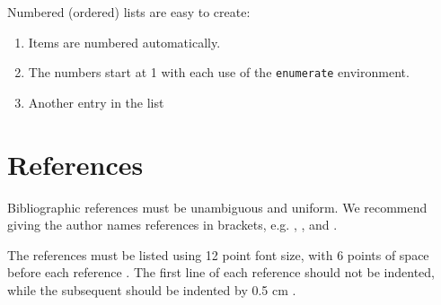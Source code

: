 \documentclass[12pt]{article}
\begin{document}
Numbered (ordered) lists are easy to create:
\begin{enumerate}
  \item Items are numbered automatically.
  \item The numbers start at 1 with each use of the \texttt{enumerate} environment.
  \item Another entry in the list
\end{enumerate}





\section{References}

Bibliographic references must be unambiguous and uniform.  We recommend giving
the author names references in brackets, e.g. \cite{knuth:84},
\cite{boulic:91}, and \cite{smith:99}.

The references must be listed using 12 point font size, with 6 points of space
before each reference \cite{knuthwebsite:16}. The first line of each reference should not be indented, while the subsequent should be indented by 0.5 cm \cite{einstein:05}.



\end{document}
